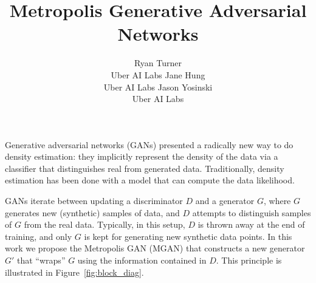\documentclass{article}
\title{Metropolis Generative Adversarial Networks}
\author{
  Ryan Turner \\
  Uber AI Labs
  \And
  Jane Hung \\
  Uber AI Labs
  \And
  Jason Yosinski \\
  Uber AI Labs
}
\begin{document}

\maketitle



Generative adversarial networks (GANs) presented a radically new way to do density estimation:
they implicitly represent the density of the data via a classifier that distinguishes real from generated data.
Traditionally, density estimation has been done with a model that can compute the data likelihood.

GANs iterate between updating a discriminator $D$ and a generator $G$, where $G$ generates new (synthetic) samples of data, and $D$ attempts to distinguish samples of $G$ from the real data.
Typically, in this setup, $D$ is thrown away at the end of training, and only $G$ is kept for generating new synthetic data points.
In this work we propose the Metropolis GAN (MGAN) that constructs a new generator $G'$ that ``wraps'' $G$ using the information contained in $D$.
This principle is illustrated in Figure~\ref{fig:block_diag}.
\end{document}
